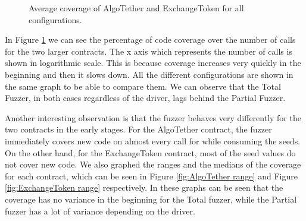 \begin{figure}[htbp]
    \centering
    \hfill
    \caption{Average coverage of AlgoTether and ExchangeToken for all configurations.}
    \label{fig:percent_coverage}
\end{figure}

In Figure \ref{fig:percent_coverage} we can see the percentage of code coverage over the number of calls for the two larger contracts.
The x axis which represents the number of calls is shown in logarithmic scale.
This is because coverage increases very quickly in the beginning and then it slows down.
All the different configurations are shown in the same graph to be able to compare them.
We can observe that the Total Fuzzer, in both cases regardless of the driver, lags behind the Partial Fuzzer.

Another interesting observation is that the fuzzer behaves very differently for the two contracts in the early stages.
For the AlgoTether contract, the fuzzer immediately covers new code on almost every call for while consuming the seeds.
On the other hand, for the ExchangeToken contract, most of the seed values do not cover new code.
We also graphed the ranges and the medians of the coverage for each contract, which can be seen in Figure \ref{fig:AlgoTether range} and Figure \ref{fig:ExchangeToken range} respectively.
In these graphs can be seen that the coverage has no variance in the beginning for the Total fuzzer, while the Partial fuzzer has a lot of variance depending on the driver.

